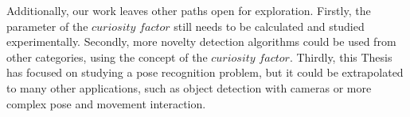 Additionally, our work leaves other paths open for exploration. Firstly, the parameter of the $curiosity$ $factor$ still needs to be calculated and studied experimentally. Secondly, more novelty detection algorithms could be used from other categories, using the concept of the $curiosity$ $factor$. Thirdly, this Thesis has focused on studying a pose recognition problem, but it could be extrapolated to many other applications, such as object detection with cameras or more complex pose and movement interaction.

\begin{flushright}

\end{flushright}